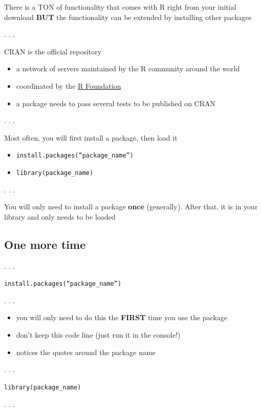 \documentclass[
  letterpaper,
  DIV=11,
  numbers=noendperiod,
  oneside]{scrartcl}
\providecommand{\tightlist}{%
  \setlength{\itemsep}{0pt}\setlength{\parskip}{0pt}}\usepackage{longtable,booktabs,array}
\begin{document}
There is a TON of functionality that comes with R right from your
initial download \textbf{BUT} the functionality can be extended by
installing other packages

. . .

CRAN is the official repository

\begin{itemize}
\tightlist
\item
  a network of servers maintained by the R community around the world
\item
  coordinated by the \href{https://www.r-project.org/foundation/}{R
  Foundation}
\item
  a package needs to pass several tests to be published on CRAN
\end{itemize}

. . .

Most often, you will first install a package, then load it

\begin{itemize}
\tightlist
\item
  \texttt{install.packages(“package\_name”)}
\item
  \texttt{library(package\_name)}
\end{itemize}

. . .

You will only need to install a package \textbf{once} (generally). After
that, it is in your library and only needs to be loaded

\hypertarget{one-more-time}{%
\subsection{One more time}\label{one-more-time}}

. . .

\texttt{install.packages(“package\_name”)}

. . .

\begin{itemize}
\tightlist
\item
  you will only need to do this the \textbf{FIRST} time you use the
  package
\item
  don't keep this code line (just run it in the console!)
\item
  notices the quotes around the package name
\end{itemize}

. . .

\texttt{library(package\_name)}

. . .
\end{document}
